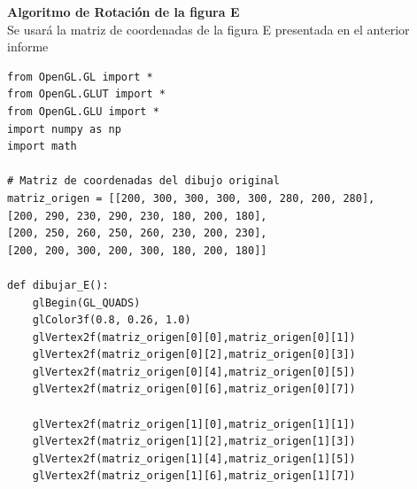 \documentclass[a4paper]{article}
\begin{document}
\Large{\textbf{Algoritmo de Rotación de la figura E}}\\
Se usará la matriz de coordenadas de la figura E presentada en el anterior informe
\begin{center}
\begin{mycodeboxl}
\begin{lstlisting}
from OpenGL.GL import *
from OpenGL.GLUT import *
from OpenGL.GLU import *
import numpy as np
import math

# Matriz de coordenadas del dibujo original
matriz_origen = [[200, 300, 300, 300, 300, 280, 200, 280],
[200, 290, 230, 290, 230, 180, 200, 180],
[200, 250, 260, 250, 260, 230, 200, 230],
[200, 200, 300, 200, 300, 180, 200, 180]]

def dibujar_E():
    glBegin(GL_QUADS)
    glColor3f(0.8, 0.26, 1.0)
    glVertex2f(matriz_origen[0][0],matriz_origen[0][1])
    glVertex2f(matriz_origen[0][2],matriz_origen[0][3])
    glVertex2f(matriz_origen[0][4],matriz_origen[0][5])
    glVertex2f(matriz_origen[0][6],matriz_origen[0][7])

    glVertex2f(matriz_origen[1][0],matriz_origen[1][1])
    glVertex2f(matriz_origen[1][2],matriz_origen[1][3])
    glVertex2f(matriz_origen[1][4],matriz_origen[1][5])
    glVertex2f(matriz_origen[1][6],matriz_origen[1][7])

\end{lstlisting}
\end{mycodeboxl}
\end{center}
\newpage
\end{document}
